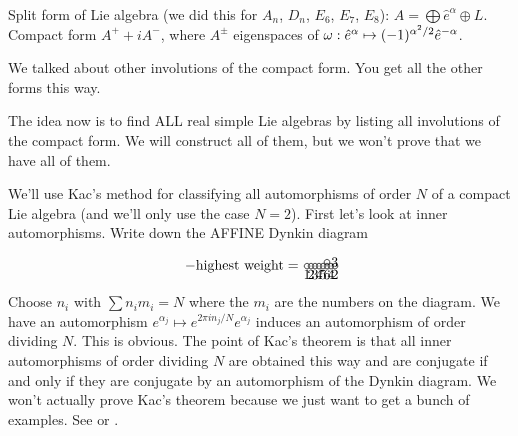  \setcounter{lecture}{29}

 Split form of Lie algebra (we did this for $A_n$, $D_n$, $E_6$, $E_7$, $E_8$): $A=\bigoplus
 \hat e^\alpha \oplus L$. Compact form $A^++iA^-$, where $A^\pm$ eigenspaces of
 $\omega:\hat e^\alpha\mapsto (-1)^{\alpha^2/2}\hat e^{-\alpha}$.

 We talked about other involutions of the compact form. You get all the other forms
 this way.

 The idea now is to find ALL real simple Lie algebras by listing all involutions of
 the compact form. We will construct all of them, but we won't prove that we have all
 of them.

 We'll use Kac's method for classifying all automorphisms of order $N$ of a compact
 Lie algebra (and we'll only use the case $N=2$). First let's look at inner
 automorphisms. Write down the AFFINE Dynkin diagram
 \[\begin{xy}
   (0,0) *+!U{2} *\cir<2pt>{};
   p-(1,0) *+!U{4} *\cir<2pt>{} **@{-};
   p-(1,0) *+!U{6} *\cir<2pt>{} **@{-};
       p+(0,+1) *+!L{3} *\cir<2pt>{} **@{-},
   p-(1,0) *+!U{5} *\cir<2pt>{} **@{-};
   p-(1,0) *+!U{4} *\cir<2pt>{} **@{-};
  p-(1,0) *+!U{3} *\cir<2pt>{} **@{-};
   p-(1,0) *+!U{2} *\cir<2pt>{} **@{-};
   p-(1,0) *+!U{1} *++!R{-\text{highest weight} =} *\cir<2pt>{} **@{-};
 \end{xy}\]
 Choose $n_i$ with $\sum n_im_i=N$ where the $m_i$ are the numbers on the diagram. We
 have an automorphism $e^{\alpha_j}\mapsto e^{2\pi i n_j/N}e^{\alpha_j}$ induces an
 automorphism of order dividing $N$. This is obvious. The point of Kac's theorem is
 that all inner automorphisms of order dividing $N$ are obtained this way and are
 conjugate if and only if they are conjugate by an automorphism of the Dynkin diagram.
 We won't actually prove Kac's theorem because we just want to get a bunch of
 examples. See \cite{Kac:IDLA} or \cite{Helgason}.

